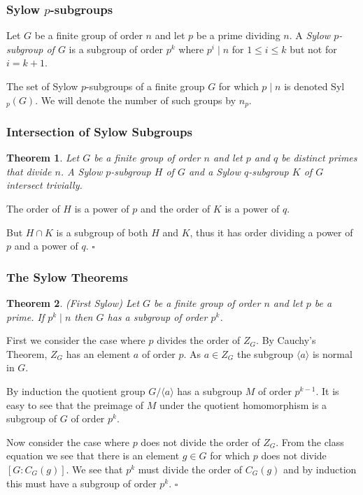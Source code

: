 \documentclass[10pt]{article}
\newtheorem{theorem}{Theorem}[section]
\newenvironment{proof}[1][Proof]{\begin{trivlist}
\item[\hskip \labelsep {\itshape #1}]}{\end{trivlist}}
\newenvironment{definition}[1][Definition]{\begin{trivlist}
\item[\hskip \labelsep {\bfseries #1}]}{\end{trivlist}}
\begin{document}
\subsubsection{Sylow $p$-subgroups}

\begin{definition}
Let $G$ be a finite group of order $n$ and let $p$ be a prime dividing $n$. A \emph{Sylow $p$-subgroup of $G$} is a subgroup of order $p^k$ where $p^i \;|\; n$ for $1 \leq i \leq k$ but not for $i = k + 1$.
\end{definition}

\begin{definition}
The set of Sylow $p$-subgroups of a finite group $G$ for which $p \;|\; n$ is denoted Syl$_p(G)$. We will denote the number of such groups by $n_p$.
\end{definition}

\subsubsection{Intersection of Sylow Subgroups}

\begin{theorem}
Let $G$ be a finite group of order $n$ and let $p$ and $q$ be distinct primes that divide $n$. A Sylow $p$-subgroup $H$ of $G$ and a Sylow $q$-subgroup $K$ of $G$ intersect trivially.
\end{theorem}

\begin{proof}
The order of $H$ is a power of $p$ and the order of $K$ is a power of $q$.

But $H \cap K$ is a subgroup of both $H$ and $K$, thus it has order dividing a power of $p$ and a power of $q$. $\square$
\end{proof}

\subsubsection{The Sylow Theorems}

\begin{theorem} (First Sylow)
Let $G$ be a finite group of order $n$ and let $p$ be a prime. If $p^k \;|\; n$ then $G$ has a subgroup of order $p^k$.
\end{theorem}

\begin{proof}
First we consider the case where $p$ divides the order of $Z_G$. By Cauchy's Theorem, $Z_G$ has an element $a$ of order $p$. As $a \in Z_G$ the subgroup $\langle a \rangle$ is normal in $G$.

By induction the quotient group $G/\langle a \rangle$ has a subgroup $M$ of order $p^{k-1}$. It is easy to see that the preimage of $M$ under the quotient homomorphism is a subgroup of $G$ of order $p^k$.

Now consider the case where $p$ does not divide the order of $Z_G$. From the class equation we see that there is an element $g \in G$ for which $p$ does not divide $[G:C_G(g)]$. We see that $p^k$ must divide the order of $C_G(g)$ and by induction this must have a subgroup of order $p^k$. $\square$
\end{proof}
\end{document}
